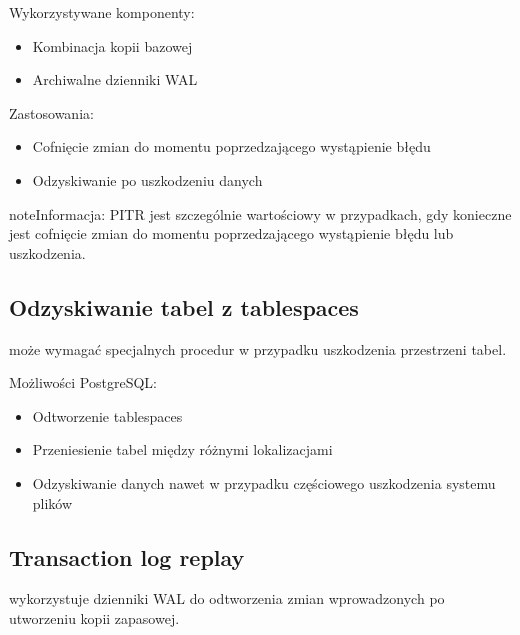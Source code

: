 \documentclass[letterpaper,10pt,polish]{sphinxmanual}
\begin{document}
\sphinxAtStartPar
Wykorzystywane komponenty:
\begin{itemize}
\item {} 
\sphinxAtStartPar
Kombinacja kopii bazowej

\item {} 
\sphinxAtStartPar
Archiwalne dzienniki WAL

\end{itemize}

\sphinxAtStartPar
Zastosowania:
\begin{itemize}
\item {} 
\sphinxAtStartPar
Cofnięcie zmian do momentu poprzedzającego wystąpienie błędu

\item {} 
\sphinxAtStartPar
Odzyskiwanie po uszkodzeniu danych

\end{itemize}

\begin{sphinxadmonition}{note}{Informacja:}
\sphinxAtStartPar
PITR jest szczególnie wartościowy w przypadkach, gdy konieczne jest cofnięcie zmian do momentu poprzedzającego wystąpienie błędu lub uszkodzenia.
\end{sphinxadmonition}


\subsection{Odzyskiwanie tabel z tablespaces}
\label{\detokenize{kopie_zapasowe_i_odzyskiwanie_danych:odzyskiwanie-tabel-z-tablespaces}}
\sphinxAtStartPar
{} może wymagać specjalnych procedur w przypadku uszkodzenia przestrzeni tabel.

\sphinxAtStartPar
Możliwości PostgreSQL:
\begin{itemize}
\item {} 
\sphinxAtStartPar
Odtworzenie tablespaces

\item {} 
\sphinxAtStartPar
Przeniesienie tabel między różnymi lokalizacjami

\item {} 
\sphinxAtStartPar
Odzyskiwanie danych nawet w przypadku częściowego uszkodzenia systemu plików

\end{itemize}


\subsection{Transaction log replay}
\label{\detokenize{kopie_zapasowe_i_odzyskiwanie_danych:transaction-log-replay}}
\sphinxAtStartPar
{} wykorzystuje dzienniki WAL do odtworzenia zmian wprowadzonych po utworzeniu kopii zapasowej.
\end{document}
